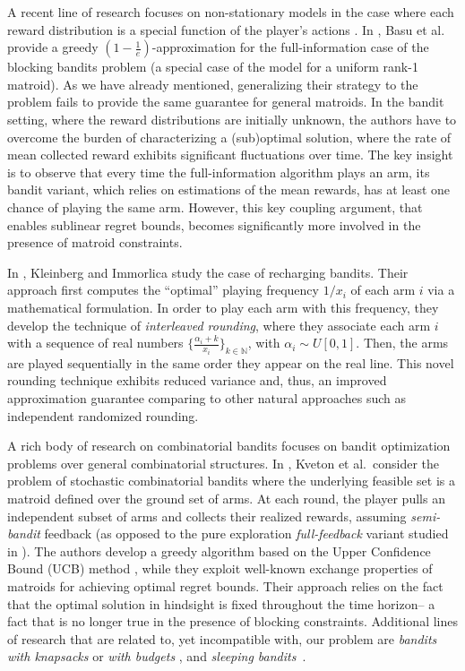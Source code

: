 A recent line of research focuses on non-stationary models in the case where each reward distribution is a special function of the player's actions \cite{ CCB19, PBG19,BPCS20}. In \cite{BSSS19}, Basu et al. provide a greedy $\left(1-\frac{1}{e}\right)$-approximation for the full-information case of the blocking bandits problem (a special case of the \mbb model for a uniform rank-1 matroid). As we have already mentioned, generalizing their strategy to the \mbb problem fails to provide the same guarantee for general matroids. In the bandit setting, where the reward distributions are initially unknown, the authors have to overcome the burden of characterizing a (sub)optimal solution, where the rate of mean collected reward exhibits significant fluctuations over time. The key insight is to observe that every time the full-information algorithm plays an arm, its bandit variant, which relies on estimations of the mean rewards, has at least one chance of playing the same arm. However, this key coupling argument, that enables sublinear regret bounds, becomes significantly more involved in the presence of matroid constraints. 

In \cite{KI18}, Kleinberg and Immorlica study the case of recharging bandits. Their approach first computes the ``optimal'' playing frequency ${1/x_i}$ of each arm $i$ via a mathematical formulation. In order to play each arm with this frequency, they develop the technique of {\em interleaved rounding}, where they associate each arm $i$ with a sequence of real numbers $\{\frac{\alpha_i +k}{x_i}\}_{k \in \mathbb{N}}$, with $\alpha_i \sim U[0,1]$. Then, the arms are played sequentially in the same order they appear on the real line. This novel rounding technique exhibits reduced variance and, thus, an improved approximation guarantee comparing to other natural approaches such as independent randomized rounding.

A rich body of research on combinatorial bandits \cite{CTPL15, CWYW16,WWFLLL16,KWAS15,KWAS15b, WC17} focuses on bandit optimization problems over general combinatorial structures.
In \cite{KWAEE14}, Kveton et al.\ consider the problem of stochastic combinatorial bandits where the underlying feasible set is a matroid defined over the ground set of arms. At each round, the player pulls an independent subset of arms and collects their realized rewards, assuming {\em semi-bandit} feedback (as opposed to the pure exploration {\em full-feedback} variant studied in \cite{CGL16}). The authors develop a greedy algorithm based on the Upper Confidence Bound (UCB) method \cite{ACBF02}, while they exploit well-known exchange properties of matroids for achieving optimal regret bounds. Their approach relies on the fact that the optimal solution in hindsight is fixed throughout the time horizon-- a fact that is no longer true in the presence of blocking constraints. Additional lines of research that are related to, yet incompatible with, our problem are {\em bandits with knapsacks} \cite{BKS18,SA18} or {\em with budgets} \cite{CJS15, Sliv13}, and {\em sleeping bandits}~\cite{KNMS10}. 



